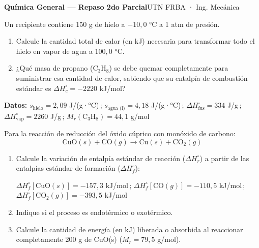 \documentclass[11pt]{article}
\newcommand{\ejercicio}[1]{\par\vspace{10pt}{\large\bfseries\color{NavyBlue}Ejercicio #1}\par
  \nointerlineskip\vspace{2pt}{\color{NavyBlue!40}\rule{\linewidth}{0.4pt}}\par\vspace{2pt}}
\begin{document}
{\LARGE\bfseries Química General — Repaso 2do Parcial}\hfill{\small UTN FRBA · Ing. Mecánica}\par
\vspace{2pt}{\color{NavyBlue}\rule{\linewidth}{0.8pt}}\par

\ejercicio{1}
Un recipiente contiene 150 g de hielo a \(-10{,}0\) °C a 1 atm de presión.
\begin{enumerate}
\item Calcule la cantidad total de calor (en kJ) necesaria para transformar todo el hielo en vapor de agua a \(100{,}0\) °C.
\item ¿Qué masa de propano (C\(_3\)H\(_8\)) se debe quemar completamente para suministrar esa cantidad de calor, sabiendo que su entalpía de combustión estándar es \(\Delta H^\circ_c = -2220\) kJ/mol?
\end{enumerate}
\begin{datos}
\textbf{Datos:} \(s_{\text{hielo}} = 2{,}09\) J/(g·°C)\,; \(s_{\text{agua (l)}} = 4{,}18\) J/(g·°C)\,; \(\Delta H^\circ_{\text{fus}} = 334\) J/g\,; \(\Delta H^\circ_{\text{vap}} = 2260\) J/g\,; \(M_r(\text{C}_3\text{H}_8) = 44{,}1\) g/mol
\end{datos}

\ejercicio{2}
Para la reacción de reducción del óxido cúprico con monóxido de carbono:
\[\text{CuO}(s) + \text{CO}(g) \rightarrow \text{Cu}(s) + \text{CO}_2(g)\]
\begin{enumerate}
\item Calcule la variación de entalpía estándar de reacción (\(\Delta H^\circ_r\)) a partir de las entalpías estándar de formación (\(\Delta H^\circ_f\)):\par
{\raggedright\(\Delta H^\circ_f[\text{CuO}(s)] = -157{,}3\) kJ/mol\,; \(\Delta H^\circ_f[\text{CO}(g)] = -110{,}5\) kJ/mol\,;\\ \(\Delta H^\circ_f[\text{CO}_2(g)] = -393{,}5\) kJ/mol\par}
\item Indique si el proceso es endotérmico o exotérmico.
\item Calcule la cantidad de energía (en kJ) liberada o absorbida al reaccionar completamente 200 g de CuO(s) (\(M_r = 79{,}5\) g/mol).
\end{enumerate}
\end{document}
